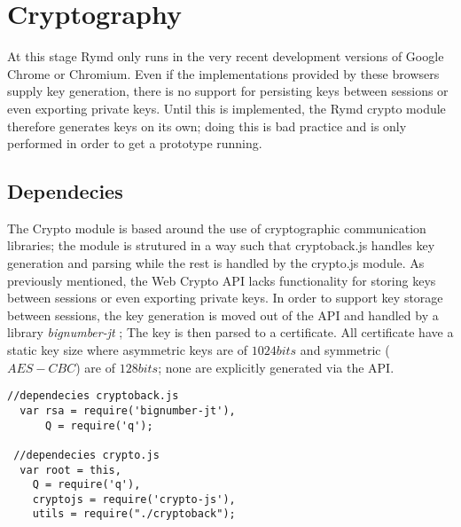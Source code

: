 \section{Cryptography}
\label{sec:cryptography}
\label{sec:cryptography}
At this stage Rymd only runs in the very recent development versions of Google Chrome or Chromium.
Even if the implementations provided by these browsers supply key generation, there is no support for persisting keys between sessions or even exporting private keys. Until this is implemented, the Rymd crypto module therefore generates keys on its own; doing this is bad practice and is only performed in order to get a prototype running.

\subsection{Dependecies}
The Crypto module is based around the use of cryptographic communication libraries; the module is strutured in a way such that cryptoback.js handles key generation and parsing while the rest is handled by the crypto.js module.
As previously mentioned, the Web Crypto API lacks functionality for storing keys between sessions or even exporting private keys. In order to support key storage between sessions, the key generation is moved out of the API and handled by a library \emph{bignumber-jt} \cite{Bignumber:Online}; The key is then parsed to a certificate.
All certificate have a static key size where asymmetric keys are of $1024bits$ and symmetric ($AES-CBC$) are of $128bits$; none are explicitly generated via the API.
\begin{Code}
\begin{lstlisting}[caption={Included database operations}, label={lst:api}]
 //dependecies cryptoback.js
  var rsa = require('bignumber-jt'),
      Q = require('q');

 //dependecies crypto.js
  var root = this,
    Q = require('q'),
    cryptojs = require('crypto-js'),
    utils = require("./cryptoback");
\end{lstlisting}
\end{Code}
